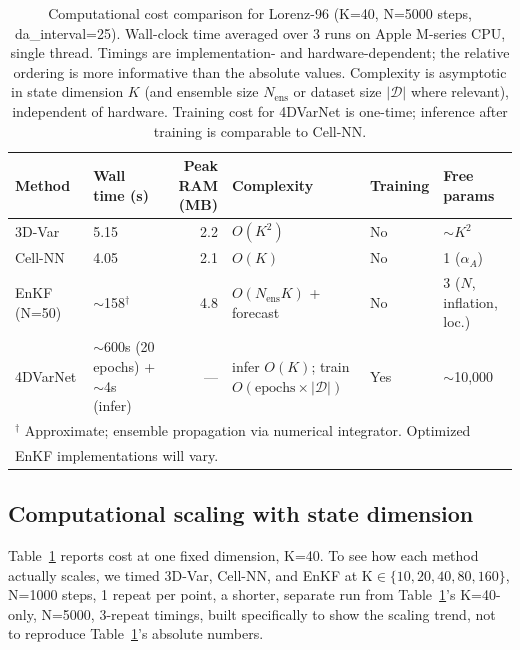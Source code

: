 \documentclass[final,5p,times,twocolumn,authoryear]{elsarticle}
\begin{document}
\begin{table}[t]
\centering
\caption{Computational cost comparison for Lorenz-96 (K=40, N=5000
steps, da\_interval=25). Wall-clock time averaged over 3 runs on
Apple M-series CPU, single thread. Timings are implementation- and
hardware-dependent; the relative ordering is more informative than
the absolute values. Complexity is asymptotic in state dimension $K$
(and ensemble size $N_\text{ens}$ or dataset size $|\mathcal{D}|$
where relevant), independent of hardware. Training cost for 4DVarNet
is one-time; inference after training is comparable to Cell-NN.}
\label{tab:cost}
\small
\begin{tabular}{@{}l p{2.3cm} r p{3.3cm} l p{2.4cm}@{}}
\toprule
Method & Wall time (s) & Peak RAM (MB) & Complexity & Training & Free params \\
\midrule
3D-Var       & 5.15 & 2.2 & $O(K^2)$ & No  & $\sim K^2$ \\
Cell-NN      & 4.05 & 2.1 & $O(K)$ & No  & 1 ($\alpha_A$) \\
EnKF (N=50)  & $\sim$158$^\dagger$ & 4.8 & $O(N_\text{ens}K)$ + forecast & No  & 3 ($N$, inflation,
loc.) \\
4DVarNet     & $\sim$600s (20 epochs) + $\sim$4s (infer) & --- & infer $O(K)$; train $O(\text{epochs}\!\times\!|\mathcal{D}|)$ & Yes & $\sim$10{,}000 \\
\bottomrule
\multicolumn{6}{l}{$^\dagger$ Approximate; ensemble propagation via
numerical integrator. Optimized}\\
\multicolumn{6}{l}{\phantom{$^\dagger$} EnKF implementations will vary.}
\end{tabular}
\end{table}

\subsection{Computational scaling with state dimension}
\label{sec:scaling}

Table~\ref{tab:cost} reports cost at one fixed dimension, K=40. To
see how each method actually scales, we timed 3D-Var, Cell-NN, and
EnKF at K$\in\{10,20,40,80,160\}$, N=1000 steps, 1 repeat per point,
a shorter, separate run from Table~\ref{tab:cost}'s K=40-only,
N=5000, 3-repeat timings, built specifically to show the scaling
trend, not to reproduce Table~\ref{tab:cost}'s absolute numbers.
\end{document}
